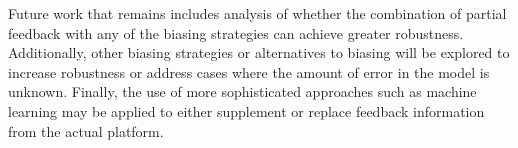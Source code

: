 \documentclass[10pt]{csce}
\begin{document}
Future work that remains includes analysis of whether the combination of
partial feedback with any of the biasing strategies can achieve greater
robustness.  Additionally, other biasing strategies or alternatives to
biasing will be explored to increase robustness or address cases where
the amount of error in the model is unknown.  Finally, the use of more
sophisticated approaches such as machine learning may be applied to either
supplement or replace feedback information from the actual platform.

{}

\end{document}
